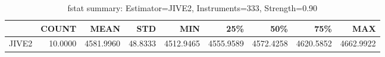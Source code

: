 \begin{table}[ht]
\centering
\caption{fstat summary: Estimator=JIVE2, Instruments=333, Strength=0.90}
\begin{tabular}{lrrrrrrrr}
\toprule
 & COUNT & MEAN & STD & MIN & 25\% & 50\% & 75\% & MAX \\
\midrule
JIVE2 & 10.0000 & 4581.9960 & 48.8333 & 4512.9465 & 4555.9589 & 4572.4258 & 4620.5852 & 4662.9922 \\
\bottomrule
\end{tabular}
\end{table}
